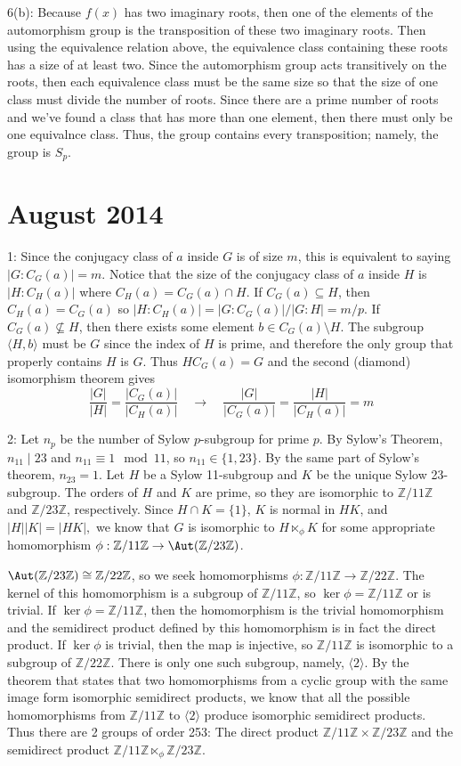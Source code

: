 \documentclass[12pt]{article}
\newcommand{\Z}{\mathbb{Z}}
\begin{document}
6(b): Because $f(x)$ has two imaginary roots, then one of the elements of the automorphism group is the transposition of these two imaginary roots. Then using the equivalence relation above, the equivalence class containing these roots has a size of at least two. Since the automorphism group acts transitively on the roots, then each equivalence class must be the same size so that the size of one class must divide the number of roots. Since there are a prime number of roots and we've found a class that has more than one element, then there must only be one equivalnce class. Thus, the group contains every transposition; namely, the group is $S_p$.

\section{August 2014}
1: Since the conjugacy class of $a$ inside $G$ is of size $m$, this is equivalent to saying $|G: C_G(a)|=m$. Notice that the size of the conjugacy class of $a$ inside $H$ is $|H: C_H(a)|$ where $C_H(a) = C_G(a) \cap H.$ If $C_G(a) \subseteq H$, then $C_H(a) = C_G(a)$ so $|H:C_H(a)| = |G:C_G(a)|/|G:H| = m/p$. If $C_G(a) \nsubseteq H$, then there exists some element $b \in C_G(a) \setminus H$. The subgroup $\langle H,b \rangle$ must be $G$ since the index of $H$ is prime, and therefore the only group that properly contains $H$ is $G$. Thus $HC_G(a) = G$ and the second (diamond) isomorphism theorem gives
$$\dfrac{|G|}{|H|} = \dfrac{|C_G(a)|}{|C_H(a)|} \quad \longrightarrow \quad \dfrac{|G|}{|C_G(a)|} = \dfrac{|H|}{|C_H(a)|} = m$$ \newline

2: Let $n_p$ be the number of Sylow $p$-subgroup for prime $p$. By Sylow's Theorem, $n_{11} \mid 23$ and $n_{11} \equiv 1 \mod 11$, so $n_{11} \in \{1, 23 \}$. By the same part of Sylow's theorem, $n_{23} = 1$. Let $H$ be a Sylow 11-subgroup and $K$ be the unique Sylow 23-subgroup. The orders of $H$ and $K$ are prime, so they are isomorphic to $\Z/11\Z$ and $\Z/23\Z$, respectively. Since $H \cap K = \{1\}$, $K$ is normal in $HK$, and $|H||K| = |HK|,$ we know that $G$ is isomorphic to $H \ltimes_{\phi} K$ for some appropriate homomorphism $\phi: \Z/11 \Z \to \Aut(\Z /23 \Z)$. \newline

$\Aut(\Z / 23 \Z) \cong \Z/22 \Z$, so we seek homomorphisms $\phi: \Z/11 \Z \to \Z/22 \Z$. The kernel of this homomorphism is a subgroup of $\Z/11\Z$, so $\ker \phi = \Z/11\Z$ or is trivial. If $\ker \phi = \Z/11 \Z$, then the homomorphism is the trivial homomorphism and the semidirect product defined by this homomorphism is in fact the direct product. If $\ker \phi$ is trivial, then the map is injective, so $\Z/11\Z$ is isomorphic to a subgroup of $\Z/22\Z$. There is only one such subgroup, namely, $\langle 2 \rangle$. By the theorem that states that two homomorphisms from a cyclic group with the same image form isomorphic semidirect products, we know that all the possible homomorphisms from $\Z/11\Z$ to $\langle 2 \rangle$ produce isomorphic semidirect products. Thus there are 2 groups of order 253: The direct product $\Z/11 \Z \times \Z/23 \Z$ and the semidirect product $\Z/11 \Z \ltimes_{\phi} \Z/23 \Z$. \newline
\end{document}
